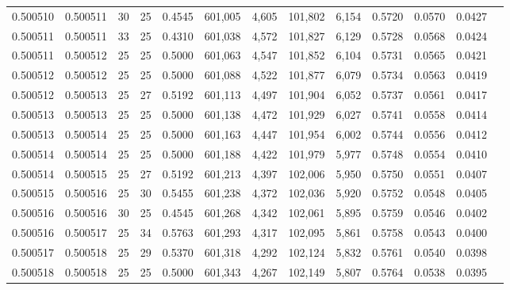 \begin{tabular}{rrrrrrrrrrrrr}
0.500510 & 0.500511 &    30 &  25 &                                     0.4545 & 601,005 &   4,605 & 101,802 &   6,154 & 0.5720 & 0.0570 & 0.0427 \\
0.500511 & 0.500511 &    33 &  25 &                                     0.4310 & 601,038 &   4,572 & 101,827 &   6,129 & 0.5728 & 0.0568 & 0.0424 \\
0.500511 & 0.500512 &    25 &  25 &                                     0.5000 & 601,063 &   4,547 & 101,852 &   6,104 & 0.5731 & 0.0565 & 0.0421 \\
0.500512 & 0.500512 &    25 &  25 &                                     0.5000 & 601,088 &   4,522 & 101,877 &   6,079 & 0.5734 & 0.0563 & 0.0419 \\
0.500512 & 0.500513 &    25 &  27 &                                     0.5192 & 601,113 &   4,497 & 101,904 &   6,052 & 0.5737 & 0.0561 & 0.0417 \\
0.500513 & 0.500513 &    25 &  25 &                                     0.5000 & 601,138 &   4,472 & 101,929 &   6,027 & 0.5741 & 0.0558 & 0.0414 \\
0.500513 & 0.500514 &    25 &  25 &                                     0.5000 & 601,163 &   4,447 & 101,954 &   6,002 & 0.5744 & 0.0556 & 0.0412 \\
0.500514 & 0.500514 &    25 &  25 &                                     0.5000 & 601,188 &   4,422 & 101,979 &   5,977 & 0.5748 & 0.0554 & 0.0410 \\
0.500514 & 0.500515 &    25 &  27 &                                     0.5192 & 601,213 &   4,397 & 102,006 &   5,950 & 0.5750 & 0.0551 & 0.0407 \\
0.500515 & 0.500516 &    25 &  30 &                                     0.5455 & 601,238 &   4,372 & 102,036 &   5,920 & 0.5752 & 0.0548 & 0.0405 \\
0.500516 & 0.500516 &    30 &  25 &                                     0.4545 & 601,268 &   4,342 & 102,061 &   5,895 & 0.5759 & 0.0546 & 0.0402 \\
0.500516 & 0.500517 &    25 &  34 &                                     0.5763 & 601,293 &   4,317 & 102,095 &   5,861 & 0.5758 & 0.0543 & 0.0400 \\
0.500517 & 0.500518 &    25 &  29 &                                     0.5370 & 601,318 &   4,292 & 102,124 &   5,832 & 0.5761 & 0.0540 & 0.0398 \\
0.500518 & 0.500518 &    25 &  25 &                                     0.5000 & 601,343 &   4,267 & 102,149 &   5,807 & 0.5764 & 0.0538 & 0.0395 \\

\end{tabular}
